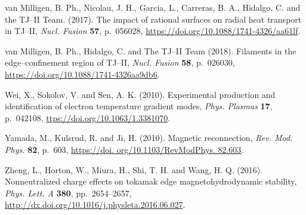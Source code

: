 \documentclass[a4paper,openany,12pt]{book}
\begin{document}
\begin{thebibliography}{175}
\bibitem{}
van Milligen, B. Ph., Nicolau, J. H., Garcia, L., Carreras, B. A., Hidalgo, C. and the TJ--II Team. (2017). The impact of rational surfaces on radial heat transport in TJ--II, {\it Nucl. Fusion} \textbf{57}, p.~056028, \url{https://doi.org/10.1088/1741-4326/aa61lf}.

\bibitem{}
van Milligen, B. Ph., Hidalgo, C. and The TJ--II Team (2018). Filaments in the edge--confinement region of TJ--II, {\it Nucl. Fusion} \textbf{58}, p.~026030, \url{https://doi.org/10.1088/1741-4326aa9db6}.

\bibitem{}
Wei, X., Sokolov, V. and Sen, A. K. (2010). Experimental production and identification of electron temperature gradient modes, {\it Phys. Plasmas} \textbf{17}, p.~042108, \url{ttps://doi.org/10.1063/1.3381070}.

\bibitem{}
Yamada, M., Kulsrud, R. and Ji, H. (2010). Magnetic reconnection, {\it Rev. Mod. Phys.} \textbf{82}, p.~603, \url{https://doi. org/10.1103/RevModPhys. 82.603}.

\bibitem{}
Zheng, L., Horton, W., Miura, H., Shi, T. H. and Wang, H. Q. (2016). Nonneutralized charge effects on tokamak edge magnetohydrodynamic stability, {\it Phys. Lett. A} \textbf{380}, pp.~2654--2657, \url{http://dx.doi.org/10.1016/j.physleta.2016.06.027}.

\end{thebibliography}
\end{document}
